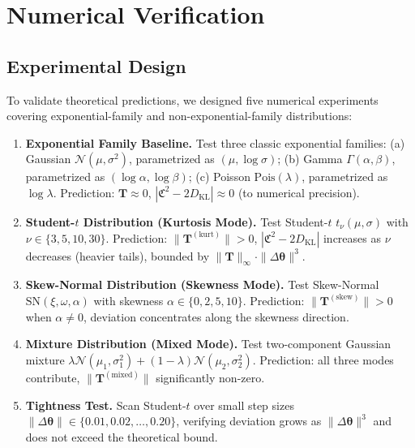 \documentclass[12pt,a4paper]{article}
\theoremstyle{plain}
\theoremstyle{definition}
\theoremstyle{remark}
\newcommand{\DKL}{D_{\mathrm{KL}}}
\newcommand{\CercisScore}{\mathfrak{C}}
\newcommand{\ACT}{\mathbf{T}}    %
\begin{document}
\section{Numerical Verification}
\label{sec:numerical}

\subsection{Experimental Design}

To validate theoretical predictions, we designed five numerical experiments covering exponential-family and non-exponential-family distributions:

\begin{enumerate}[label=\textbf{Experiment \arabic*}, leftmargin=*]
    \item \textbf{Exponential Family Baseline.} Test three classic exponential families: (a) Gaussian $\mathcal{N}(\mu, \sigma^2)$, parametrized as $(\mu, \log\sigma)$; (b) Gamma $\Gamma(\alpha, \beta)$, parametrized as $(\log\alpha, \log\beta)$; (c) Poisson $\mathrm{Pois}(\lambda)$, parametrized as $\log\lambda$. Prediction: $\ACT \approx 0$, $|\CercisScore^2 - 2\DKL| \approx 0$ (to numerical precision).
    \item \textbf{Student-$t$ Distribution (Kurtosis Mode).} Test Student-$t$ $t_\nu(\mu, \sigma)$ with $\nu \in \{3, 5, 10, 30\}$. Prediction: $\|\ACT^{(\mathrm{kurt})}\| > 0$, $|\CercisScore^2 - 2\DKL|$ increases as $\nu$ decreases (heavier tails), bounded by $\|\ACT\|_{\infty} \cdot \|\Delta\bm{\theta}\|^3$.
    \item \textbf{Skew-Normal Distribution (Skewness Mode).} Test Skew-Normal $\mathrm{SN}(\xi, \omega, \alpha)$ with skewness $\alpha \in \{0, 2, 5, 10\}$. Prediction: $\|\ACT^{(\mathrm{skew})}\| > 0$ when $\alpha \neq 0$, deviation concentrates along the skewness direction.
    \item \textbf{Mixture Distribution (Mixed Mode).} Test two-component Gaussian mixture $\lambda \mathcal{N}(\mu_1, \sigma_1^2) + (1-\lambda) \mathcal{N}(\mu_2, \sigma_2^2)$. Prediction: all three modes contribute, $\|\ACT^{(\mathrm{mixed})}\|$ significantly non-zero.
    \item \textbf{Tightness Test.} Scan Student-$t$ over small step sizes $\|\Delta\bm{\theta}\| \in \{0.01, 0.02, \ldots, 0.20\}$, verifying deviation grows as $\|\Delta\bm{\theta}\|^3$ and does not exceed the theoretical bound.
\end{enumerate}
\end{document}
